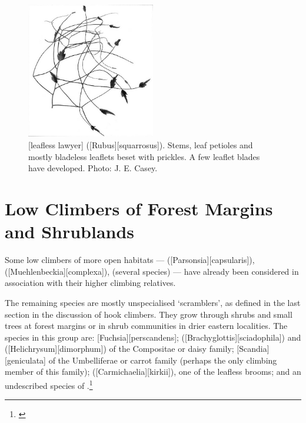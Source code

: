 \begin{figure}
	\includegraphics[width=0.5\textwidth]{graphics/figure37rubus.jpg}
	\centering
	\caption[Leafless lawyer, \emph{Rubus squarrosus}]{[leafless lawyer] ([Rubus][squarrosus]).
	Stems, leaf petioles and mostly bladeless leaflets beset with prickles.
	A few leaflet blades have developed.
	Photo: J. E. Casey.}%
	\label{fig:37rubus}
\end{figure}

\section{Low Climbers of Forest Margins and Shrublands}

Some low climbers of more open habitats ---  ([Parsonsia][capsularis]),  ([Muehlenbeckia][complexa]),  (several species) --- have already been considered in association with their higher climbing relatives.

The remaining species are mostly unspecialised `scramblers', as defined in the last section in the discussion of hook climbers.
They grow through shrubs and small trees at forest margins or in shrub communities in drier eastern localities.
The species in this group are: [Fuchsia][perscandens];  ([Brachyglottis][sciadophila]) and  ([Helichrysum][dimorphum]) of the Compositae or daisy family; [Scandia][geniculata] of the Umbelliferae or carrot family (perhaps the only climbing member of this family);  ([Carmichaelia][kirkii]), one of the leafless brooms; and an undescribed species of .\footnote{\cite{eagle1982trees}}

